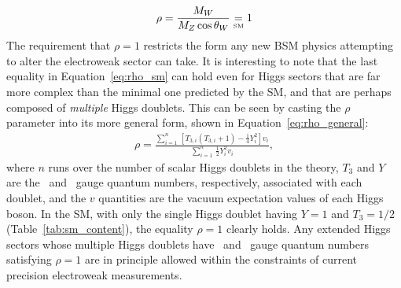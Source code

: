 \begin{align}
    \rho = \frac{
                M_W
            }
            {
                M_Z \cos \theta_W
            }
        \underset{\text{\tiny{SM}}}{=} 1
    \label{eq:rho_sm}
\end{align}
The requirement that $\rho = 1$ restricts the form any new BSM physics attempting to alter
the electroweak sector can take.
It is interesting to note that the last equality in Equation~\ref{eq:rho_sm} can hold even for Higgs sectors that are far more complex than
the minimal one predicted by the SM, and that are perhaps composed of \textit{multiple} Higgs doublets.
This can be seen by casting the $\rho$ parameter into its more general form, shown in Equation~\ref{eq:rho_general}:
\begin{align}
    \rho = \frac{
                \sum\limits_{i = 1}^n \, \left[ T_{3,i} \left( T_{3,i} + 1 \right) - \frac{1}{4} Y_i^2 \right ] v_i
            }
            {
                \sum\limits_{i=1}^n \, \frac{1}{2} Y_i^2 v_i
            },
    \label{eq:rho_general}
\end{align}
where $n$ runs over the number of scalar Higgs doublets in the theory, $T_{3}$ and $Y$ are the \SUtwo~and \Uone~gauge
quantum numbers, respectively, associated with each doublet, and the $v$ quantities are the vacuum expectation values of
each Higgs boson.
In the SM, with only the single Higgs doublet having $Y = 1$ and $T_3 = 1/2$ (Table~\ref{tab:sm_content}),
the equality $\rho = 1$ clearly holds.
Any extended Higgs sectors whose multiple Higgs doublets have \SUtwo~and \Uone~gauge quantum numbers
satisfying $\rho = 1$ are in principle allowed within the constraints of current precision electroweak measurements.

